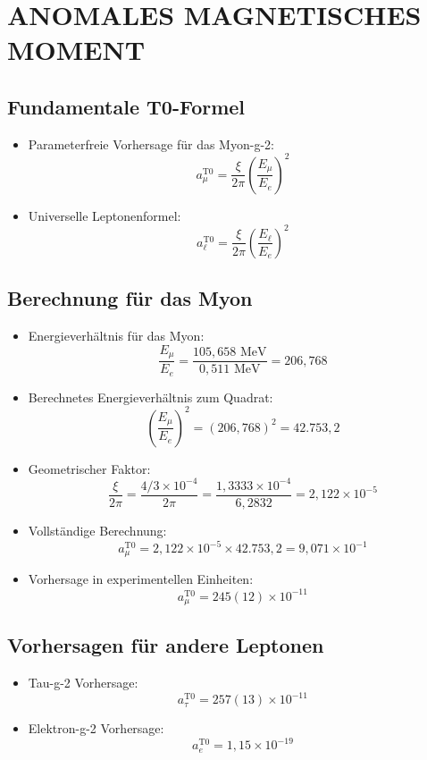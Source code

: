 \documentclass[12pt,a4paper]{article}
\begin{document}
	\section{ANOMALES MAGNETISCHES MOMENT}

\subsection{Fundamentale T0-Formel}
\begin{itemize}
	\item Parameterfreie Vorhersage f\"{u}r das Myon-g-2:
	$$\boxed{a_\mu^{\text{T0}} = \frac{\xi}{2\pi} \left(\frac{E_\mu}{E_e}\right)^2}$$
	
	\item Universelle Leptonenformel:
	$$\boxed{a_\ell^{\text{T0}} = \frac{\xi}{2\pi} \left(\frac{E_\ell}{E_e}\right)^2}$$
\end{itemize}

\subsection{Berechnung f\"{u}r das Myon}
\begin{itemize}
	\item Energieverh\"{a}ltnis f\"{u}r das Myon:
	$$\frac{E_\mu}{E_e} = \frac{105,658 \text{ MeV}}{0,511 \text{ MeV}} = 206,768$$
	
	\item Berechnetes Energieverh\"{a}ltnis zum Quadrat:
	$$\left(\frac{E_\mu}{E_e}\right)^2 = (206,768)^2 = 42.753,2$$
	
	\item Geometrischer Faktor:
	$$\frac{\xi}{2\pi} = \frac{4/3 \times 10^{-4}}{2\pi} = \frac{1,3333 \times 10^{-4}}{6,2832} = 2,122 \times 10^{-5}$$
	
	\item Vollst\"{a}ndige Berechnung:
	$$a_\mu^{\text{T0}} = 2,122 \times 10^{-5} \times 42.753,2 = 9,071 \times 10^{-1}$$
	
	\item Vorhersage in experimentellen Einheiten:
	$$a_\mu^{\text{T0}} = 245(12) \times 10^{-11}$$
\end{itemize}

\subsection{Vorhersagen f\"{u}r andere Leptonen}
\begin{itemize}
	\item Tau-g-2 Vorhersage:
	$$a_\tau^{\text{T0}} = 257(13) \times 10^{-11}$$
	
	\item Elektron-g-2 Vorhersage:
	$$a_e^{\text{T0}} = 1,15 \times 10^{-19}$$
\end{itemize}
\end{document}
